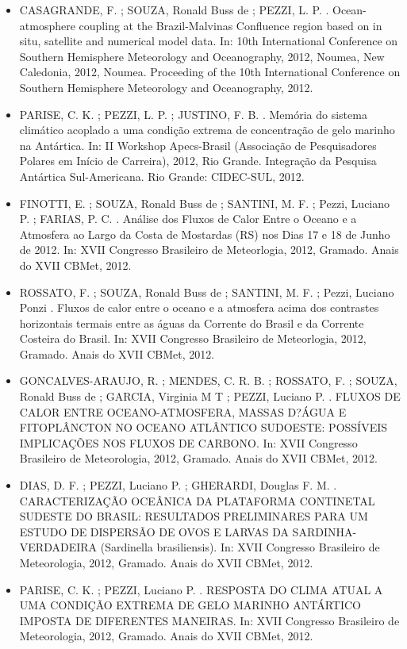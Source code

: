 \documentclass[11pt, a4paper]{awesome-cv}
\begin{document}
\begin{cvletter}
\begin{itemize}
  \item[] CASAGRANDE, F. ; SOUZA, Ronald Buss de ; PEZZI, L. P. . Ocean-atmosphere coupling at the 
  Brazil-Malvinas Confluence region based on in situ, satellite and numerical model data. 
  In: 10th International Conference on Southern Hemisphere Meteorology and Oceanography, 
  2012, Noumea, New Caledonia, 2012, Noumea. Proceeding of the 10th International 
  Conference on Southern Hemisphere Meteorology and Oceanography, 2012. 
  
  \item[] PARISE, C. K. ; PEZZI, L. P. ; JUSTINO, F. B. . Memória do sistema climático acoplado a uma condição extrema de concentração de gelo marinho na Antártica. In: II Workshop Apecs-Brasil (Associação de Pesquisadores Polares em Início de Carreira), 2012, Rio Grande. Integração da Pesquisa Antártica Sul-Americana. Rio Grande: CIDEC-SUL, 2012. 
  \item[] FINOTTI, E. ; SOUZA, Ronald Buss de ; SANTINI, M. F. ; Pezzi, Luciano P. ; FARIAS, P. C. . Análise dos Fluxos de Calor Entre o Oceano e a Atmosfera ao Largo da Costa de Mostardas (RS) nos Dias 17 e 18 de Junho de 2012. In: XVII Congresso Brasileiro de Meteorlogia, 2012, Gramado. Anais do XVII CBMet, 2012. 
  \item[] ROSSATO, F. ; SOUZA, Ronald Buss de ; SANTINI, M. F. ; Pezzi, Luciano Ponzi . Fluxos de calor entre o oceano e a atmosfera acima dos contrastes horizontais termais entre as águas da Corrente do Brasil e da Corrente Costeira do Brasil. In: XVII Congresso Brasileiro de Meteorlogia, 2012, Gramado. Anais do XVII CBMet, 2012. 
  \item[] GONCALVES-ARAUJO, R. ; MENDES, C. R. B. ; ROSSATO, F. ; SOUZA, Ronald Buss de ; GARCIA, Virginia M T ; PEZZI, Luciano P. . FLUXOS DE CALOR ENTRE OCEANO-ATMOSFERA, MASSAS D?ÁGUA E FITOPLÂNCTON NO OCEANO ATLÂNTICO SUDOESTE: POSSÍVEIS IMPLICAÇÕES NOS FLUXOS DE CARBONO. In: XVII Congresso Brasileiro de Meteorologia, 2012, Gramado. Anais do XVII CBMet, 2012. 
  \item[] DIAS, D. F. ; PEZZI, Luciano P. ; GHERARDI, Douglas F. M. . CARACTERIZAÇÃO OCEÂNICA DA PLATAFORMA CONTINETAL SUDESTE DO BRASIL: RESULTADOS PRELIMINARES PARA UM ESTUDO DE DISPERSÃO DE OVOS E LARVAS DA SARDINHA-VERDADEIRA (Sardinella brasiliensis). In: XVII Congresso Brasileiro de Meteorologia, 2012, Gramado. Anais do XVII CBMet, 2012. 
  \item[] PARISE, C. K. ; PEZZI, Luciano P. . RESPOSTA DO CLIMA ATUAL A UMA CONDIÇÃO EXTREMA DE GELO MARINHO ANTÁRTICO IMPOSTA DE DIFERENTES MANEIRAS. In: XVII Congresso Brasileiro de Meteorologia, 2012, Gramado. Anais do XVII CBMet, 2012. 

\end{itemize}
\end{cvletter}
\end{document}
